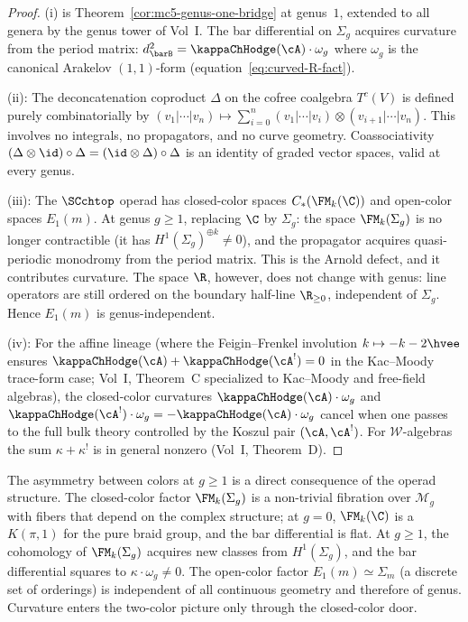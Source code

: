 \begin{proof}
(i) is Theorem~\ref{cor:mc5-genus-one-bridge} at genus~$1$,
extended to all genera by the genus tower of Vol~I\@. The bar
differential on $\Sigma_g$ acquires curvature from the period
matrix: $d_{\barB}^2 = \kappaChHodge(\cA) \cdot \omega_g$ where
$\omega_g$ is the canonical Arakelov $(1,1)$-form
(equation~\eqref{eq:curved-R-fact}).

(ii): The deconcatenation coproduct $\Delta$ on the cofree
coalgebra $T^c(V)$ is defined purely combinatorially by
$(v_1 | \cdots | v_n) \mapsto
\sum_{i=0}^n (v_1 | \cdots | v_i) \otimes
(v_{i+1} | \cdots | v_n)$. This involves no integrals, no
propagators, and no curve geometry. Coassociativity
$(\Delta \otimes \id) \circ \Delta
= (\id \otimes \Delta) \circ \Delta$ is an identity of graded
vector spaces, valid at every genus.

(iii): The $\SCchtop$ operad has closed-color spaces
$C_\ast(\FM_k(\C))$ and open-color spaces $E_1(m)$. At
genus $g \ge 1$, replacing $\C$ by $\Sigma_g$: the space
$\FM_k(\Sigma_g)$ is no longer contractible (it has
$H^1(\Sigma_g)^{\oplus k} \ne 0$), and the propagator acquires
quasi-periodic monodromy from the period matrix. This is
the Arnold defect, and it contributes curvature. The space
$\R$, however, does not change with genus: line operators
are still ordered on the boundary half-line $\R_{\ge 0}$,
independent of $\Sigma_g$. Hence $E_1(m)$ is genus-independent.

(iv): For the affine lineage (where the Feigin--Frenkel
involution $k \mapsto -k - 2\hvee$ ensures
$\kappaChHodge(\cA)+\kappaChHodge(\cA^!)=0$ in the Kac--Moody trace-form case; Vol~I, Theorem~C
specialized to Kac--Moody and free-field algebras),
the closed-color curvatures
$\kappaChHodge(\cA) \cdot \omega_g$ and
$\kappaChHodge(\cA^!) \cdot \omega_g = -\kappaChHodge(\cA) \cdot \omega_g$
cancel when one passes to the full bulk theory controlled by
the Koszul pair $(\cA, \cA^!)$. For $\mathcal{W}$-algebras
the sum $\kappa + \kappa^!$ is in general nonzero
(Vol~I, Theorem~D).
\end{proof}

\begin{remark}
\label{rem:asymmetry-operadic}
The asymmetry between colors at $g \ge 1$ is a direct
consequence of the operad structure. The closed-color factor
$\FM_k(\Sigma_g)$ is a non-trivial fibration over
$\mathcal{M}_g$ with fibers that depend on the complex
structure; at $g = 0$, $\FM_k(\C)$ is a $K(\pi, 1)$ for the
pure braid group, and the bar differential is flat. At
$g \ge 1$, the cohomology of $\FM_k(\Sigma_g)$ acquires new
classes from $H^1(\Sigma_g)$, and the bar differential squares
to $\kappa \cdot \omega_g \ne 0$. The open-color factor
$E_1(m) \simeq \Sigma_m$ (a discrete set of orderings) is
independent of all continuous geometry and therefore of genus.
Curvature enters the two-color picture only through the
closed-color door.
\end{remark}

